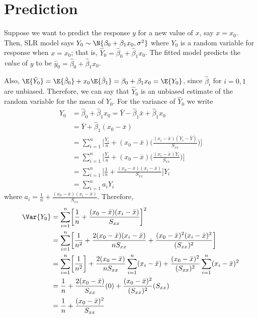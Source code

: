 \section{Prediction}
Suppose we want to predict the response $ y $
for a new value of $ x $, say $ x=x_0 $. Then,
SLR model says
$ Y_0 \sim \N{\beta_0+\beta_1 x_0,\sigma^2} $
where $ Y_0 $ is a random variable for response when $ x=x_0 $;
that is, $ \hat{Y}_0=\hat{\beta}_0+\hat{\beta}_1x_0 $.
The fitted model predicts the \emph{value} of $ y $
to be $ \hat{y}_0=\hat{\beta}_0+\hat{\beta}_1x_0 $.

Also, $\E{\hat{Y}_0}=\E{\hat{\beta}_0}+x_0\E{\hat{\beta}_1}=
    \beta_0+\beta_1x_0=\E{Y_0} $,
since $ \hat{\beta}_i $ for $ i=0,1 $ are unbiased.
Therefore, we can say that $ \hat{Y}_0 $ is an unbiased estimate
of the random variable for the mean of $ Y_0 $. For the variance
of $ \hat{Y}_0 $ we write
\begin{align*}
    \hat{Y}_0
     & =
    \hat{\beta}_0+\hat{\beta}_1x_0=\bar{Y}-\hat{\beta}_1\bar{x}+
    \hat{\beta}_1x_0                                                                          \\
     & =\bar{Y}+\hat{\beta}_1(x_0-\bar{x})                                                    \\
     & =\sum_{i=1}^{n} \biggl[ \frac{Y_i}{n} +(x_0-\bar{x})
    \biggl( \frac{(x_i-\bar{x})(Y_i-\bar{Y})}{S_{xx}} \biggr)  \biggr]                        \\
     & =\sum_{i=1}^{n} \biggl[ \frac{Y_i}{n} +(x_0-\bar{x})
    \biggl( \frac{(x_i-\bar{x})Y_i}{S_{xx}} \biggr)  \biggr]                                  \\
     & =\sum_{i=1}^{n} \biggl[ \frac{1}{n} +\frac{(x_0-\bar{x})(x_i-\bar{x})}{S_{xx}} \biggr]
    Y_i                                                                                       \\
     & =\sum_{i=1}^{n} a_i Y_i
\end{align*}
where $ \displaystyle  a_i=\frac{1}{n} +\frac{(x_0-\bar{x})(x_i-\bar{x})}{S_{xx}} $.
Therefore,
\begin{align*}
    \Var{Y_0}
     & =\sum_{i=1}^{n} \biggl[ \frac{1}{n} +
    \frac{(x_0-\bar{x})(x_i-\bar{x})}{S_{xx}} \biggr]^2                \\
     & = \sum_{i=1}^{n} \biggl[ \frac{1}{n^2}+
        \frac{2(x_0-\bar{x})(x_i-\bar{x})}{nS_{xx}}+
    \frac{(x_0-\bar{x})^2(x_i-\bar{x})^2}{(S_{xx})^2}  \biggr]         \\
     & =\sum_{i=1}^{n} \biggl[ \frac{1}{n^2}  \biggr]+
    \frac{2(x_0-\bar{x})}{n S_{xx}}\sum_{i=1}^{n} (x_i-\bar{x})
    +\frac{(x_0-\bar{x})^2}{(S_{xx})^2} \sum_{i=1}^{n} (x_i-\bar{x})^2 \\
     & =\frac{1}{n} +\frac{2(x_0-\bar{x})}{S_{xx}}(0)+
    \frac{(x_0-\bar{x})^2}{(S_{xx})^2}(S_{xx})                         \\
     & =\frac{1}{n}+\frac{(x_0-\bar{x})^2}{S_{xx}}
\end{align*}
